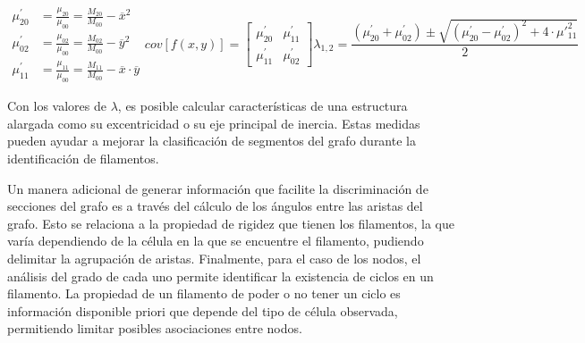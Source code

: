 \begin{subequations}
\begin{align}
    \mu_{20}^{\prime} &= \frac{\mu_{20}}{\mu_{00}} = \frac{M_{20}}{M_{00}} - \overline{x}^{2} \label{eq:mu20} \\
    \mu_{02}^{\prime} &= \frac{\mu_{02}}{\mu_{00}} = \frac{M_{02}}{M_{00}} - \overline{y}^{2} \label{eq:mu02} \\
    \mu_{11}^{\prime} &= \frac{\mu_{11}}{\mu_{00}} = \frac{M_{11}}{M_{00}} - \overline{x}\cdot\overline{y} \label{eq:mu11}
\end{align}

\begin{equation}
    \label{eq:covMatLambda}
    cov[f(x,y)] = \begin{bmatrix}
        \mu_{20}^{\prime} & \mu_{11}^{\prime} \\
        \mu_{11}^{\prime} & \mu_{02}^{\prime} 
        \end{bmatrix}
\end{equation}

\begin{equation}
    \label{eq:lambdaMoments}
    \lambda_{1,2} = \dfrac{(\mu_{20}^{\prime} + \mu_{02}^{\prime}) \pm \sqrt{(\mu_{20}^{\prime} - \mu_{02}^{\prime})^{2} + 4\cdot \mu\prime_{11}^{2} }}{2}
\end{equation}
\end{subequations}

Con los valores de $\lambda$, es posible calcular caracter\'isticas de una estructura alargada como su excentricidad o su eje principal de inercia. Estas medidas pueden ayudar a mejorar la clasificaci\'on de segmentos del grafo durante la identificaci\'on de filamentos.


Un manera adicional de generar informaci\'on que facilite la discriminaci\'on de secciones del grafo es a trav\'es del c\'alculo de los \'angulos entre las aristas del grafo. Esto se relaciona a la propiedad de rigidez que tienen los filamentos, la que var\'ia dependiendo de la c\'elula en la que se encuentre el filamento, pudiendo delimitar la agrupaci\'on de aristas. Finalmente, para el caso de los nodos, el an\'alisis del grado de cada uno permite identificar la existencia de ciclos\cite{wilson1979introduction} en un filamento. La propiedad de un filamento de poder o no tener un ciclo es informaci\'on disponible priori que depende del tipo de c\'elula observada, permitiendo limitar posibles asociaciones entre nodos.


